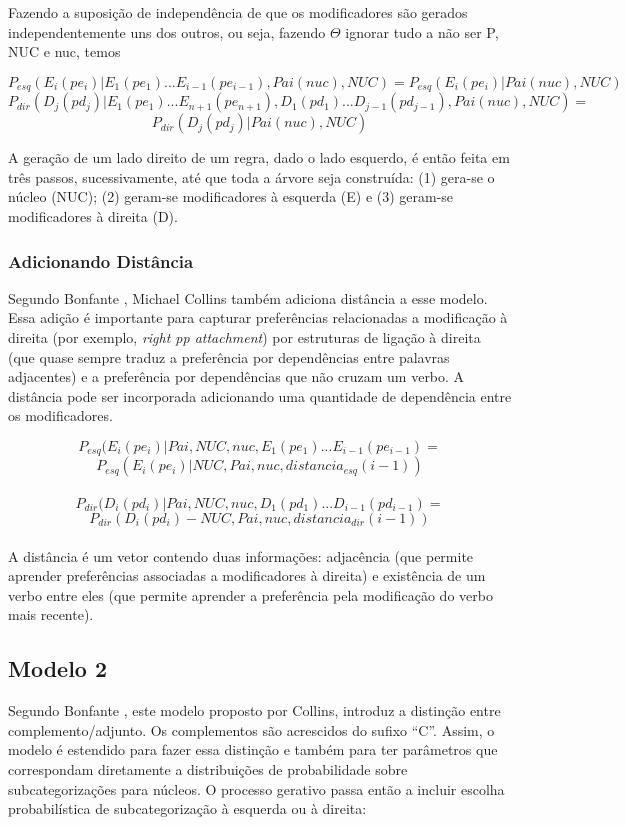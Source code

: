 Fazendo a suposição de independência de que os modificadores são gerados independentemente uns dos outros, ou seja, fazendo $\Theta$ ignorar tudo a não ser P, NUC e nuc, temos

$$P_{esq}(E_i(pe_i)|E_1(pe_1)...E_{i-1}(pe_{i-1}), Pai(nuc),NUC) = P_{esq}(E_i(pe_i)|Pai(nuc),NUC)$$
$$P_{dir}(D_j(pd_j)|E_1(pe_1)...E_{n+1}(pe_{n+1}),D_1(pd_1)...D_{j-1}(pd_{j-1}), Pai(nuc),NUC) =$$
$$P_{dir}(D_j(pd_j)|Pai(nuc),NUC)$$

A geração de um lado direito de um regra, dado o lado esquerdo, é então feita em
três passos, sucessivamente, até que toda a árvore seja construída: (1) gera-se o núcleo (NUC); (2) geram-se modificadores à esquerda (E) e (3) geram-se modificadores à direita (D).

\subsubsection{Adicionando Distância}
\label{sub:distancia}

Segundo Bonfante \cite{bonfante03}, Michael Collins também adiciona distância a esse modelo. Essa adição é importante para capturar preferências relacionadas a modificação à direita (por exemplo, \emph{right pp attachment}) por estruturas de ligação à direita (que quase sempre traduz a preferência por dependências entre palavras adjacentes) e a preferência por dependências que não cruzam um verbo. A distância pode ser incorporada adicionando uma quantidade de dependência entre os modificadores.

$$P_{esq}(E_i(pe_i)|Pai,NUC, nuc,E_1(pe_1)...E_{i-1}(pe_{i - 1}) = $$
$$P_{esq}(E_i(pe_i)|NUC, Pai, nuc, distancia_{esq}(i - 1))$$
\\
$$P_{dir}(D_i(pd_i)|Pai,NUC, nuc,D_1(pd_1)...D_{i-1}(pd_{i - 1}) = $$
$$P_{dir}(D_i(pd_i)-NUC, Pai, nuc, distancia_{dir}(i - 1))$$
\\

A distância é um vetor contendo duas informações: adjacência (que permite aprender preferências associadas a modificadores à direita) e existência de um verbo entre eles (que permite aprender a preferência pela modificação do verbo mais recente).

\subsection{Modelo 2}
\label{sub:modelo2}

Segundo Bonfante \cite{bonfante03}, este modelo proposto por Collins, introduz a distinção entre complemento/adjunto. Os complementos  são acrescidos do sufixo ``C''. Assim, o modelo é estendido para fazer essa distinção e também para ter parâmetros que correspondam diretamente a distribuições de probabilidade sobre subcategorizações para núcleos.
O processo gerativo passa então a incluir escolha probabilística de subcategorização à esquerda ou à direita:

